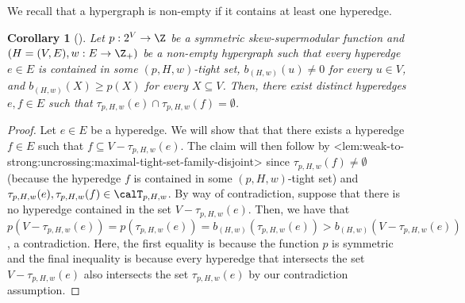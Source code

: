\documentclass{article}
\def\Cref#1{<#1>}%
\newtheorem{corollary}{Corollary}[section]
\newcommand{\maximalTightSetFamily}[1]{\ensuremath{\calT_{#1}}\xspace}
\newcommand{\shubhang}[1]{{\color{blue}[{\tiny Shubhang: \bf #1}]\marginpar{\color{blue}*}}}
\newcommand{\knote}[1]{{\color{red}[{\tiny Karthik: \bf #1}]\marginpar{\color{red}*}}}
\newcommand{\maximalTightSetContainingHyperedge}[1]{\ensuremath{\tau_{#1}}\xspace}
\begin{document}
We recall that a hypergraph is non-empty if it contains at least one hyperedge. 
\begin{corollary}[\hspace{-1sp}\cite{Bernath-Kiraly}]
\label{cor:weak-to-strong:uncrossing:exist-two-hyperedges-contained-in-disjoint-maximal-tight-sets}
Let $p:2^V\rightarrow\Z$ be a symmetric skew-supermodular function and $\left(H = (V, E), w:E \rightarrow\Z_+\right)$ be a non-empty hypergraph 
such that every hyperedge $e \in E$ is contained in some $(p, H, w)$-tight set, $b_{(H,w)}(u) \not = 0$ for every $u \in V$, and $b_{(H,w)}(X) \geq p(X)$ for every $X \subseteq V$. 
Then, there exist distinct hyperedges $e,f \in E$ such that $\maximalTightSetContainingHyperedge{p, H, w}(e) \cap \maximalTightSetContainingHyperedge{p, H, w}(f) = \emptyset$.
\end{corollary}
\begin{proof}
Let $e \in E$ be a hyperedge.
We will show that that there exists a hyperedge $f \in E$ such that $f \subseteq V - \maximalTightSetContainingHyperedge{p, H, w}(e)$. The claim will then follow by \Cref{lem:weak-to-strong:uncrossing:maximal-tight-set-family-disjoint} since $\maximalTightSetContainingHyperedge{p, H, w}(f) \not = \emptyset$ (because the hyperedge $f$ is contained in some $(p, H, w)$-tight set) and $\maximalTightSetContainingHyperedge{p, H, w}(e), \maximalTightSetContainingHyperedge{p, H , w}(f) \in \maximalTightSetFamily{p, H, w}$.
By way of contradiction, suppose that there is no hyperedge contained in the set $V - \maximalTightSetContainingHyperedge{p, H, w}(e)$. Then, we have that $p(V - \maximalTightSetContainingHyperedge{p, H, w}(e)) = p(\maximalTightSetContainingHyperedge{p, H, w}(e)) = b_{(H,w)}(\maximalTightSetContainingHyperedge{p, H, w}(e)) > b_{(H,w)}(V - \maximalTightSetContainingHyperedge{p, H, w}(e))$, a contradiction. Here, the first equality is because the function $p$ is symmetric and the final inequality is because every hyperedge that intersects the set $V - \maximalTightSetContainingHyperedge{p, H, w}(e)$ also intersects the set $\maximalTightSetContainingHyperedge{p, H, w}(e)$ by our contradiction assumption.
\end{proof}
\end{document}
